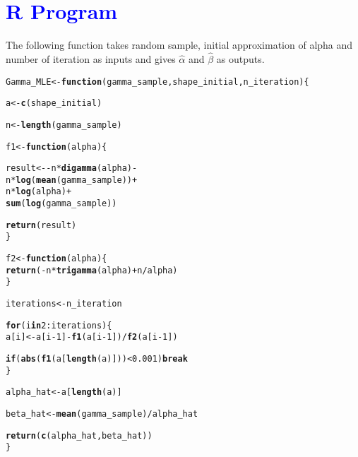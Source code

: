 \documentclass[11pt, a4paper]{article}\usepackage[]{graphicx}\usepackage[]{xcolor}
\makeatletter
\newcommand{\hlnum}[1]{\textcolor[rgb]{0.686,0.059,0.569}{#1}}%
\newcommand{\hlopt}[1]{\textcolor[rgb]{0,0,0}{#1}}%
\newcommand{\hldef}[1]{\textcolor[rgb]{0.345,0.345,0.345}{#1}}%
\newcommand{\hlkwa}[1]{\textcolor[rgb]{0.161,0.373,0.58}{\textbf{#1}}}%
\newcommand{\hlkwb}[1]{\textcolor[rgb]{0.69,0.353,0.396}{#1}}%
\newcommand{\hlkwc}[1]{\textcolor[rgb]{0.333,0.667,0.333}{#1}}%
\newcommand{\hlkwd}[1]{\textcolor[rgb]{0.737,0.353,0.396}{\textbf{#1}}}%
\newenvironment{kframe}{%
 \def\at@end@of@kframe{}%
 \ifinner\ifhmode%
  \def\at@end@of@kframe{\end{minipage}}%
  \begin{minipage}{\columnwidth}%
 \fi\fi%
 \def\FrameCommand##1{\hskip\@totalleftmargin \hskip-\fboxsep
 \colorbox{shadecolor}{##1}\hskip-\fboxsep
     \hskip-\linewidth \hskip-\@totalleftmargin \hskip\columnwidth}%
 \MakeFramed {\advance\hsize-\width
   \@totalleftmargin\z@ \linewidth\hsize
   \@setminipage}}%
 {\par\unskip\endMakeFramed%
 \at@end@of@kframe}
\newenvironment{knitrout}{}{} %
\makeatother
\begin{document}
\section*{\faArrowAltCircleRight[regular] \textcolor{blue}{R Program}}

The following function takes random sample, initial approximation of alpha and number of iteration as inputs and gives $\hat{\alpha}$ and $\hat{\beta}$ as outputs.

\begin{knitrout}
\color{fgcolor}\begin{kframe}
\begin{alltt}
\hldef{Gamma_MLE} \hlkwb{<-} \hlkwa{function}\hldef{(}\hlkwc{gamma_sample}\hldef{,} \hlkwc{shape_initial}\hldef{,} \hlkwc{n_iteration}\hldef{)\{}

  \hldef{a} \hlkwb{<-} \hlkwd{c}\hldef{(shape_initial)}

  \hldef{n} \hlkwb{<-} \hlkwd{length}\hldef{(gamma_sample)}

  \hldef{f1} \hlkwb{<-} \hlkwa{function}\hldef{(}\hlkwc{alpha}\hldef{)\{}

    \hldef{result} \hlkwb{<-} \hlopt{-} \hldef{n} \hlopt{*} \hlkwd{digamma}\hldef{(alpha)} \hlopt{-}
                \hldef{n} \hlopt{*} \hlkwd{log}\hldef{(}\hlkwd{mean}\hldef{(gamma_sample))} \hlopt{+}
                \hldef{n} \hlopt{*} \hlkwd{log}\hldef{(alpha)} \hlopt{+}
                \hlkwd{sum}\hldef{(}\hlkwd{log}\hldef{(gamma_sample))}

    \hlkwd{return}\hldef{(result)}
  \hldef{\}}

  \hldef{f2} \hlkwb{<-} \hlkwa{function}\hldef{(}\hlkwc{alpha}\hldef{)\{}
    \hlkwd{return}\hldef{(}\hlopt{-}\hldef{n} \hlopt{*} \hlkwd{trigamma}\hldef{(alpha)} \hlopt{+} \hldef{n} \hlopt{/} \hldef{alpha)}
  \hldef{\}}

  \hldef{iterations} \hlkwb{<-} \hldef{n_iteration}

  \hlkwa{for} \hldef{(i} \hlkwa{in} \hlnum{2}\hlopt{:}\hldef{iterations) \{}
    \hldef{a[i]} \hlkwb{<-} \hldef{a[i}\hlopt{-}\hlnum{1}\hldef{]} \hlopt{-} \hlkwd{f1}\hldef{(a[i}\hlopt{-}\hlnum{1}\hldef{])} \hlopt{/} \hlkwd{f2}\hldef{(a[i}\hlopt{-}\hlnum{1}\hldef{])}

    \hlkwa{if}\hldef{(}\hlkwd{abs}\hldef{(}\hlkwd{f1}\hldef{(a[}\hlkwd{length}\hldef{(a)]))} \hlopt{<} \hlnum{0.001}\hldef{)} \hlkwa{break}
  \hldef{\}}

  \hldef{alpha_hat} \hlkwb{<-} \hldef{a[}\hlkwd{length}\hldef{(a)]}

  \hldef{beta_hat} \hlkwb{<-} \hlkwd{mean}\hldef{(gamma_sample)} \hlopt{/} \hldef{alpha_hat}

  \hlkwd{return}\hldef{(}\hlkwd{c}\hldef{(alpha_hat, beta_hat))}
\hldef{\}}
\end{alltt}
\end{kframe}
\end{knitrout}
\end{document}
